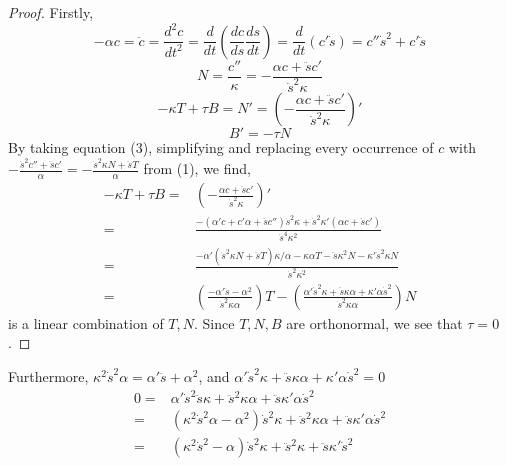 \documentclass[12pt]{amsart}
\begin{document}
\begin{proof}
Firstly,
\begin{equation}
	-\alpha c=\ddot c=\frac{d^2c}{dt^2}=\frac{d}{dt}\left(\frac{dc}{ds}\frac{ds}{dt}\right)=\frac{d}{dt}\left(c'\dot s\right)=c''\dot s^2+c'\ddot s%
\end{equation}
\begin{equation}
	N=\frac{c''}{\kappa}=-\frac{\alpha c+\ddot sc'}{\dot s^2\kappa}
\end{equation}
\begin{equation}
	-\kappa T+\tau B=N'=\left(-\frac{\alpha c+\ddot sc'}{\dot s^2\kappa}\right)'
\end{equation}
\begin{equation}
	B'=-\tau N
\end{equation}
By taking equation (3), simplifying and replacing every occurrence of $c$ with $-\frac{\dot s^2c''+\ddot sc'}{\alpha}=-\frac{\dot s^2\kappa N+\ddot sT}{\alpha}$ from (1), we find, 
\begin{align*}
	-\kappa T+\tau B=&\left(-\frac{\alpha c+\ddot sc'}{\dot s^2\kappa}\right)'
	\\=&\frac{-(\alpha'c+c'\alpha+\ddot sc'')\dot s^2\kappa+\dot s^2\kappa'(\alpha c+\ddot sc')}{\dot s^4\kappa^2}
	\\=&\frac{-\alpha'(\dot s^2\kappa N+\ddot sT)\kappa/\alpha-\kappa\alpha T-\ddot s\kappa^2N-\kappa'\dot s^2\kappa N}{\dot s^2\kappa^2}
	\\=&\left(\frac{-\alpha'\ddot s-\alpha^2}{\dot s^2\kappa\alpha}\right)T-\left(\frac{\alpha'\dot s^2\kappa+\ddot s\kappa\alpha+\kappa'\alpha\dot s^2}{\dot s^2\kappa\alpha}\right)N
\end{align*}
is a linear combination of $T, N$. Since $T,N,B$ are orthonormal, we see that $\tau=0$.
\end{proof}
Furthermore, $\kappa^2\dot s^2\alpha=\alpha'\ddot s+\alpha^2$, and $\alpha'\dot s^2\kappa+\ddot s\kappa\alpha+\kappa'\alpha\dot s^2=0$
\begin{align*}
	0=&\alpha'\dot s^2\ddot s\kappa+\ddot s^2\kappa\alpha+\ddot s\kappa'\alpha\dot s^2
	\\=&(\kappa^2\dot s^2\alpha-\alpha^2)\dot s^2\kappa+\ddot s^2\kappa\alpha+\ddot s\kappa'\alpha\dot s^2
	\\=&(\kappa^2\dot s^2-\alpha)\dot s^2\kappa+\ddot s^2\kappa+\ddot s\kappa'\dot s^2
\end{align*}
\end{document}
